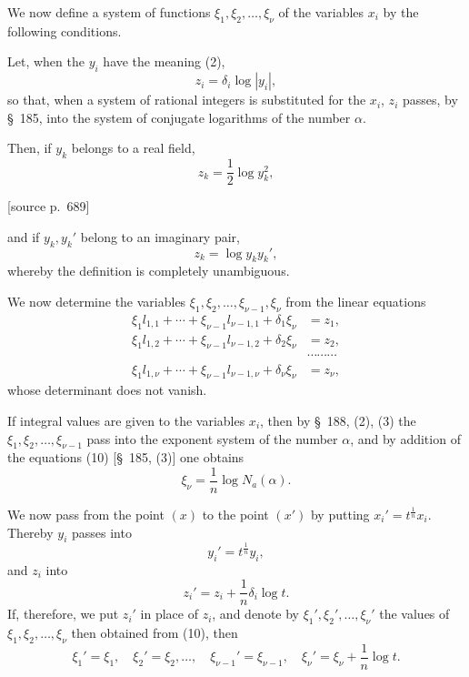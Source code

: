 \documentclass[11pt]{article}
\newcommand{\Na}{N_a}
\newcommand{\srcpage}[1]{\par\medskip\noindent\textsf{[source p.~#1]}\par\smallskip}
\begin{document}
We now define a system of functions $\xi_1,\xi_2,\ldots,\xi_\nu$ of the variables $x_i$ by the following conditions.

Let, when the $y_i$ have the meaning (2),
\begin{equation}
z_i=\delta_i\log|y_i|,
\tag{7}
\end{equation}
so that, when a system of rational integers is substituted for the $x_i$, $z_i$ passes, by \S~185, into the system of conjugate logarithms of the number $\alpha$.

Then, if $y_k$ belongs to a real field,
\begin{equation}
z_k=\frac12\log y_k^2,
\tag{8}
\end{equation}
\srcpage{689}
and if $y_k,y_k'$ belong to an imaginary pair,
\begin{equation}
z_k=\log y_ky_k',
\tag{9}
\end{equation}
whereby the definition is completely unambiguous.

We now determine the variables $\xi_1,\xi_2,\ldots,\xi_{\nu-1},\xi_\nu$ from the linear equations
\begin{equation}
\begin{aligned}
\xi_1l_{1,1}+\cdots+\xi_{\nu-1}l_{\nu-1,1}+\delta_1\xi_\nu&=z_1,\\
\xi_1l_{1,2}+\cdots+\xi_{\nu-1}l_{\nu-1,2}+\delta_2\xi_\nu&=z_2,\\
&\cdots\cdots\cdots\\
\xi_1l_{1,\nu}+\cdots+\xi_{\nu-1}l_{\nu-1,\nu}+\delta_\nu\xi_\nu&=z_\nu,
\end{aligned}
\tag{10}
\end{equation}
whose determinant does not vanish.

If integral values are given to the variables $x_i$, then by \S~188, (2), (3) the $\xi_1,\xi_2,\ldots,\xi_{\nu-1}$ pass into the exponent system of the number $\alpha$, and by addition of the equations (10) [\S~185, (3)] one obtains
\begin{equation}
\xi_\nu=\frac1n\log \Na(\alpha).
\tag{11}
\end{equation}

We now pass from the point $(x)$ to the point $(x')$ by putting $x_i'=t^{\frac1n}x_i$. Thereby $y_i$ passes into
\[
y_i'=t^{\frac1n}y_i,
\]
and $z_i$ into
\[
z_i'=z_i+\frac1n\delta_i\log t.
\]
If, therefore, we put $z_i'$ in place of $z_i$, and denote by $\xi_1',\xi_2',\ldots,\xi_\nu'$ the values of $\xi_1,\xi_2,\ldots,\xi_\nu$ then obtained from (10), then
\begin{equation}
\xi_1'=\xi_1,
\quad \xi_2'=\xi_2,
\ldots,
\quad \xi_{\nu-1}'=\xi_{\nu-1},
\quad \xi_\nu'=\xi_\nu+\frac1n\log t.
\tag{12}
\end{equation}
\end{document}
